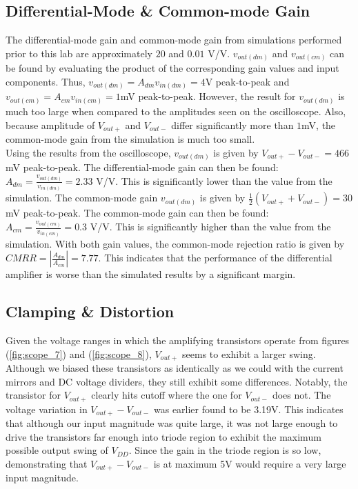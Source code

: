 \subsection{Differential-Mode \& Common-mode Gain}

The differential-mode gain and common-mode gain from simulations performed prior to this lab are approximately $20$ and $0.01$ \si{\volt}/\si{\volt}.
$v_{out(dm)}$ and $v_{out(cm)}$ can be found by evaluating the product of the corresponding gain values and input components.
Thus, $v_{out(dm)} = A_{dm}v_{in(dm)} = 4$\si{\volt} peak-to-peak and $v_{out(cm)} = A_{cm}v_{in(cm)} = 1$\si{\milli\volt} peak-to-peak.
However, the result for $v_{out(dm)}$ is much too large when compared to the amplitudes seen on the oscilloscope.
Also, because amplitude of $V_{out+}$ and $V_{out-}$ differ significantly more than $1$\si{\milli\volt}, the common-mode gain from the simulation is much too small.\\

Using the results from the oscilloscope, $v_{out(dm)}$ is given by $V_{out+} - V_{out-} = 466$\si{\milli\volt} peak-to-peak.
The differential-mode gain can then be found: $A_{dm} = \frac{v_{out(dm)}}{v_{in(dm)}} = 2.33$ \si{\volt}/\si{\volt}.
This is significantly lower than the value from the simulation.
The common-mode gain $v_{out(dm)}$ is given by $\frac{1}{2}(V_{out+} + V_{out-}) = 30$\si{\milli\volt} peak-to-peak.
The common-mode gain can then be found: $A_{cm} = \frac{v_{out(cm)}}{v_{in(cm)}} = 0.3$ \si{\volt}/\si{\volt}.
This is significantly higher than the value from the simulation.
With both gain values, the common-mode rejection ratio is given by $CMRR = |\frac{A_{dm}}{A_{cm}}| = 7.77$.
This indicates that the performance of the differential amplifier is worse than the simulated results by a significant margin. \\

\subsection{Clamping \& Distortion}

Given the voltage ranges in which the amplifying transistors operate from figures (\ref{fig:scope_7}) and (\ref{fig:scope_8}), $V_{out+}$ seems to exhibit a larger swing.
Although we biased these transistors as identically as we could with the current mirrors and DC voltage dividers, they still exhibit some differences.
Notably, the transistor for $V_{out+}$ clearly hits cutoff where the one for $V_{out-}$ does not.
The voltage variation in $V_{out+} - V_{out-}$ was earlier found to be 3.19\si{\volt}.
This indicates that although our input magnitude was quite large, it was not large enough to drive the transistors far enough into triode region to exhibit the maximum possible output swing of $V_{DD}$.
Since the gain in the triode region is so low, demonstrating that $V_{out+} - V_{out-}$ is at maximum 5V would require a very large input magnitude.

